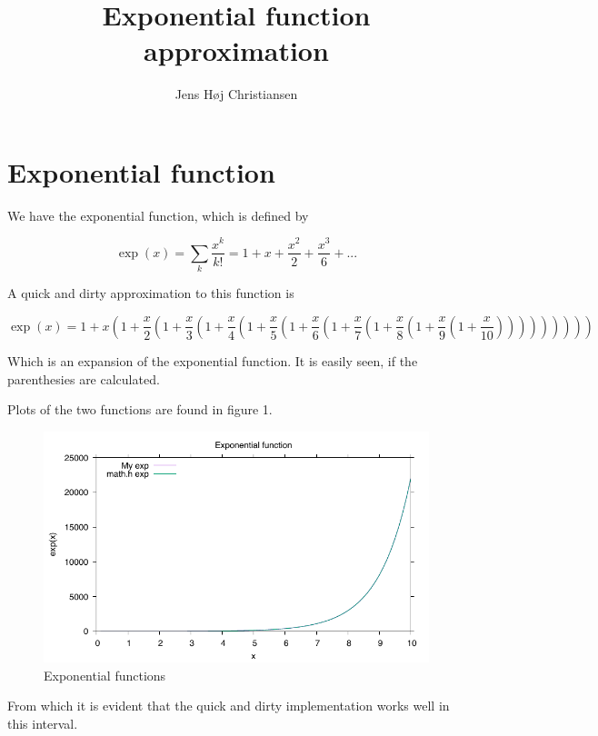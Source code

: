 \documentclass[twocolumn]{article}
\title{Exponential function approximation}
\author{Jens Høj Christiansen}
\begin{document}
\maketitle

\section{Exponential function}

We have the exponential function, which is defined by

$$\exp(x) = \sum_k \frac{x^k}{k!} = 1 + x + \frac{x^2}{2} + \frac{x^3}{6} + ...$$

A quick and dirty approximation to this function is

$$\exp(x) = 1+x\left(1+\frac{x}{2}\left(1+\frac{x}{3}\left(1+\frac{x}{4}\left(1+\frac{x}{5}\left(1+\frac{x}{6}\left(1+\frac{x}{7}\left(1+\frac{x}{8}\left(1+\frac{x}{9}\left(1+\frac{x}{10}\right) \right) \right) \right) \right) \right) \right) \right) \right)$$

Which is an expansion of the exponential function. It is easily seen, if the parenthesies are calculated.

Plots of the two functions are found in figure 1.

\begin{figure}[h]
    \includegraphics{plot.gnuplot.pdf}
    \caption{Exponential functions}
    \label{fig:Gnuplot}
\end{figure}

From which it is evident that the quick and dirty implementation works well in this interval.
\end{document}
